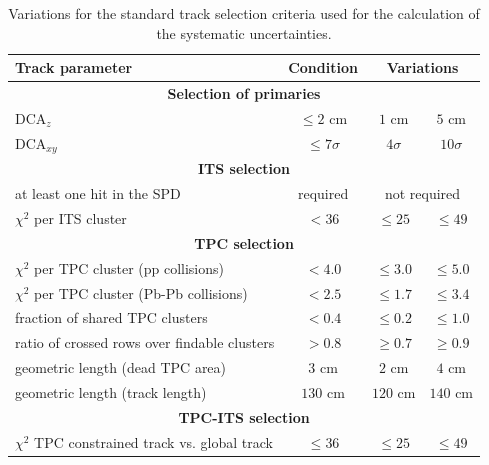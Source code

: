 \documentclass[12pt,a4paper]{report}
\begin{document}
\begin{table}[H]
\renewcommand{\arraystretch}{1.5}
\centering
\begin{tabular}{l c c c}
\toprule
\rowcolor{headerBlue}  \textbf{Track parameter} &  \textbf{Condition}  &  \multicolumn{2}{c}{\textbf{Variations}} \\
\midrule
\multicolumn{4}{c}{\textbf{Selection of primaries}} \\
\midrule
$\text{DCA}_{z}$ & $\leq 2 $ cm & $1$ cm & $5$ cm\\
$\text{DCA}_{xy}$ & $\leq 7\sigma$ & $4\sigma$ & $10\sigma$ \\
\midrule
\multicolumn{4}{c}{\textbf{ITS selection}} \\
\midrule
at least one hit in the SPD & required  & \multicolumn{2}{c}{not required}\\
$\chi^2$ per ITS cluster  & $< 36$ & $\leq 25$ & $\leq 49$ \\
\midrule
\multicolumn{4}{c}{\textbf{TPC selection}} \\
\midrule
$\chi^2$ per TPC cluster (pp collisions) & $< 4.0$  & $\leq 3.0$ & $\leq 5.0$\\
$\chi^2$ per TPC cluster (Pb-Pb collisions) & $< 2.5$ & $\leq 1.7$ & $\leq 3.4$\\
fraction of shared  TPC clusters&  $<0.4$  & $\leq 0.2$ & $\leq 1.0$ \\
ratio of crossed rows over findable clusters  & $> 0.8$ & $\geq 0.7$ & $\geq 0.9$\\
geometric length (dead TPC area) & $3$ cm & $2$ cm & $4$ cm \\
geometric length (track length) & $130$ cm & $120$ cm & $140$ cm\\

\midrule
\multicolumn{4}{c}{\textbf{TPC-ITS selection}} \\
\midrule
$\chi^2$ TPC constrained track vs. global track  & $\leq 36$ & $\leq 25$ & $\leq 49$ \\
\bottomrule
\end{tabular}
\caption{Variations for the standard track selection criteria used for the calculation of the systematic uncertainties.}
\label{tab:curVar}
\end{table}
\end{document}
